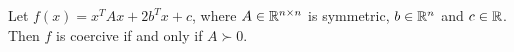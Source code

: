 \documentclass{ExerciseSheet}
\newif\ifsolutions
\begin{document}


\vskip 0.5cm
\begin{problem}
    Let $f(x)=x^TAx+2b^Tx+c$, where $A\in\mathbb{R}^{n\times n}$ is symmetric, $b\in\mathbb{R}^n$ and $c\in\mathbb{R}$. Then $f$ is coercive if and only if $A \succ0$.
\end{problem}

\ifsolutions
\vskip 0.3cm
\end{document}

